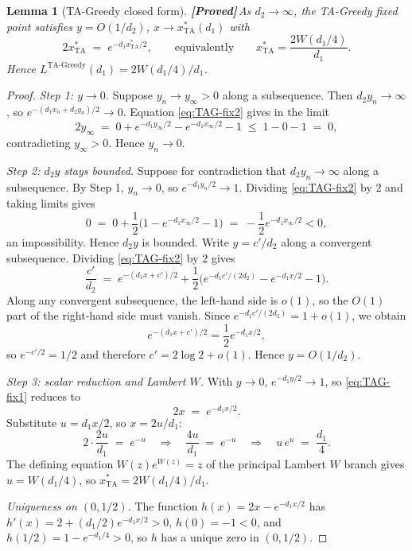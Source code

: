 \documentclass{article}
\theoremstyle{plain}
\newtheorem{lemma}{Lemma}
\theoremstyle{definition}
\newcommand{\proved}{\textcolor{provedgreen}{\textbf{[Proved]}}\,}
\begin{document}
\begin{lemma}[TA-Greedy closed form]\label{lem:TAG}
\proved As $d_2\to\infty$, the TA-Greedy fixed point satisfies $y=O(1/d_2)$, $x\to x^\ast_{\mathrm{TA}}(d_1)$ with
\[
2x^\ast_{\mathrm{TA}} \;=\; e^{-d_1 x^\ast_{\mathrm{TA}}/2},\qquad\text{equivalently}\qquad x^\ast_{\mathrm{TA}} = \frac{2W(d_1/4)}{d_1}.
\]
Hence $L^{\text{TA-Greedy}}(d_1)=2W(d_1/4)/d_1$.
\end{lemma}

\begin{proof}
\emph{Step 1: $y\to 0$.} Suppose $y_n\to y_\infty>0$ along a subsequence. Then $d_2 y_n\to\infty$, so $e^{-(d_1 x_n+d_2 y_n)/2}\to 0$. Equation \eqref{eq:TAG-fix2} gives in the limit
\[
2y_\infty\;=\;0+e^{-d_1 y_\infty/2}-e^{-d_1 x_\infty/2}-1\;\le\;1-0-1\;=\;0,
\]
contradicting $y_\infty>0$. Hence $y_n\to 0$.

\emph{Step 2: $d_2 y$ stays bounded.} Suppose for contradiction that $d_2y_n\to\infty$ along a subsequence. By Step 1, $y_n\to 0$, so $e^{-d_1y_n/2}\to 1$. Dividing \eqref{eq:TAG-fix2} by $2$ and taking limits gives
\[
0\;=\;0+\frac12\bigl(1-e^{-d_1x_\infty/2}-1\bigr)
\;=\;-\frac12 e^{-d_1x_\infty/2}<0,
\]
an impossibility. Hence $d_2y$ is bounded. Write $y=c'/d_2$ along a convergent subsequence. Dividing \eqref{eq:TAG-fix2} by $2$ gives
\[
\frac{c'}{d_2}
\;=\;
e^{-(d_1x+c')/2}
+\frac12\bigl(e^{-d_1c'/(2d_2)}-e^{-d_1x/2}-1\bigr).
\]
Along any convergent subsequence, the left-hand side is $o(1)$, so the $O(1)$ part of the right-hand side must vanish. Since $e^{-d_1c'/(2d_2)}=1+o(1)$, we obtain
\[
e^{-(d_1x+c')/2}=\frac12e^{-d_1x/2},
\]
so $e^{-c'/2}=1/2$ and therefore $c'=2\log 2+o(1)$. Hence $y=O(1/d_2)$.

\emph{Step 3: scalar reduction and Lambert $W$.} With $y\to 0$, $e^{-d_1 y/2}\to 1$, so \eqref{eq:TAG-fix1} reduces to
\begin{equation}\label{eq:TAG-scalar}
2x\;=\;e^{-d_1 x/2}.
\end{equation}
Substitute $u=d_1 x/2$, so $x=2u/d_1$:
\[
2\cdot\frac{2u}{d_1}\;=\;e^{-u}\quad\Longrightarrow\quad\frac{4u}{d_1}\;=\;e^{-u}\quad\Longrightarrow\quad u\,e^u\;=\;\frac{d_1}{4}.
\]
The defining equation $W(z)e^{W(z)}=z$ of the principal Lambert $W$ branch gives $u=W(d_1/4)$, so $x^\ast_{\mathrm{TA}}=2W(d_1/4)/d_1$.

\emph{Uniqueness on $(0,1/2)$.} The function $h(x)=2x-e^{-d_1 x/2}$ has $h'(x)=2+(d_1/2)e^{-d_1 x/2}>0$, $h(0)=-1<0$, and $h(1/2)=1-e^{-d_1/4}>0$, so $h$ has a unique zero in $(0,1/2)$.
\end{proof}
\end{document}
